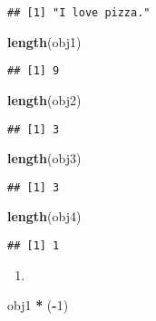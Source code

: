 \documentclass[
]{article}
\newenvironment{Shaded}{\begin{snugshade}}{\end{snugshade}}
\newcommand{\DecValTok}[1]{\textcolor[rgb]{0.00,0.00,0.81}{#1}}
\newcommand{\FunctionTok}[1]{\textcolor[rgb]{0.13,0.29,0.53}{\textbf{#1}}}
\newcommand{\NormalTok}[1]{#1}
\newcommand{\SpecialCharTok}[1]{\textcolor[rgb]{0.81,0.36,0.00}{\textbf{#1}}}
\providecommand{\tightlist}{%
  \setlength{\itemsep}{0pt}\setlength{\parskip}{0pt}}
\begin{document}
\begin{verbatim}
## [1] "I love pizza."
\end{verbatim}

\begin{Shaded}
\begin{Highlighting}[]
\FunctionTok{length}\NormalTok{(obj1)}
\end{Highlighting}
\end{Shaded}

\begin{verbatim}
## [1] 9
\end{verbatim}

\begin{Shaded}
\begin{Highlighting}[]
\FunctionTok{length}\NormalTok{(obj2)}
\end{Highlighting}
\end{Shaded}

\begin{verbatim}
## [1] 3
\end{verbatim}

\begin{Shaded}
\begin{Highlighting}[]
\FunctionTok{length}\NormalTok{(obj3)}
\end{Highlighting}
\end{Shaded}

\begin{verbatim}
## [1] 3
\end{verbatim}

\begin{Shaded}
\begin{Highlighting}[]
\FunctionTok{length}\NormalTok{(obj4)}
\end{Highlighting}
\end{Shaded}

\begin{verbatim}
## [1] 1
\end{verbatim}

\begin{enumerate}
\def\labelenumi{\arabic{enumi})}
\setcounter{enumi}{1}
\tightlist
\item
\end{enumerate}

\begin{Shaded}
\begin{Highlighting}[]
\NormalTok{obj1 }\SpecialCharTok{*}\NormalTok{ (}\SpecialCharTok{{-}}\DecValTok{1}\NormalTok{)}
\end{Highlighting}
\end{Shaded}
\end{document}
